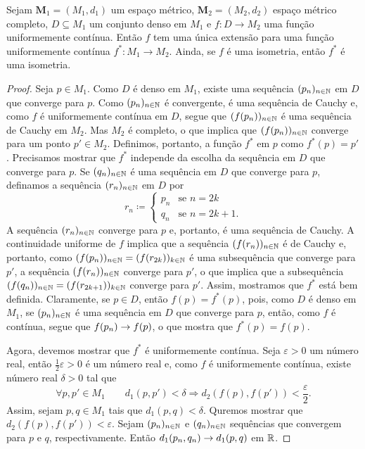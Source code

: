 \begin{teo}
	Sejam $\bm M_1 = (M_1,d_1)$  um espaço métrico, $\bm M_2 = (M_2,d_2)$ espaço métrico completo, $D \subseteq M_1$ um conjunto denso em $M_1$ e $f: D \to M_2$ uma função uniformemente contínua. Então $f$ tem uma única extensão para uma função uniformemente contínua $f^*: M_1 \to M_2$. Ainda, se $f$ é uma isometria, então $f^*$ é uma isometria.
\end{teo}
\begin{proof}
	Seja $p \in M_1$. Como $D$ é denso em $M_1$, existe uma sequência $(p_n)_{n \in \mathbb{N}}$ em $D$ que converge para $p$. Como $(p_n)_{n \in \mathbb{N}}$ é convergente, é uma sequência de Cauchy e, como $f$ é uniformemente contínua em $D$, segue que $(f(p_n))_{n \in \mathbb{N}}$ é uma sequência de Cauchy em $M_2$. Mas $M_2$ é completo, o que implica que $(f(p_n))_{n \in \mathbb{N}}$ converge para um ponto $p' \in M_2$. Definimos, portanto, a função $f^*$ em $p$ como $f^*(p)=p'$. Precisamos mostrar que $f^*$ independe da escolha da sequência em $D$ que converge para $p$. Se $(q_n)_{n \in \mathbb{N}}$ é uma sequência em $D$ que converge para $p$, definamos a sequência $(r_n)_{n \in \mathbb{N}}$ em $D$ por
	\begin{equation*}
	r_n \coloneqq
			\begin{cases}
			p_n &\text{se $n=2k$}\\
			q_n &\text{se $n=2k+1$}.
			\end{cases}
	\end{equation*}
A sequência $(r_n)_{n \in \mathbb{N}}$ converge para $p$ e, portanto, é uma sequência de Cauchy. A continuidade uniforme de $f$ implica que a sequência $(f(r_n))_{n \in \mathbb{N}}$ é de Cauchy e, portanto, como $(f(p_n))_{n \in \mathbb{N}}=(f(r_{2k}))_{k \in \mathbb{N}}$ é uma subsequência que converge para $p'$, a sequência $(f(r_n))_{n \in \mathbb{N}}$ converge para $p'$, o que implica que a subsequência $(f(q_n))_{n \in \mathbb{N}}=(f(r_{2k+1}))_{k \in \mathbb{N}}$ converge para $p'$. Assim, mostramos que $f^*$ está bem definida. Claramente, se $p \in D$, então $f(p)=f^*(p)$, pois, como $D$ é denso em $M_1$, se $(p_n)_{n \in \mathbb{N}}$ é uma sequência em $D$ que converge para $p$, então, como $f$ é contínua, segue que $f(p_n) \rightarrow f(p)$, o que mostra que $f^*(p)=f(p)$.

	Agora, devemos mostrar que $f^*$ é uniformemente contínua. Seja $\varepsilon > 0$ um número real, então $\frac{1}{2}\varepsilon > 0$ é um número real e, como $f$ é uniformemente contínua, existe número real $\delta > 0$ tal que
	\begin{equation*}
	\forall p,p' \in M_1 \qquad d_1(p,p') < \delta \Rightarrow d_2(f(p),f(p')) < \frac{\varepsilon}{2}.
	\end{equation*}
Assim, sejam $p,q \in M_1$ tais que $d_1(p,q) < \delta$. Quremos mostrar que $d_2(f(p),f(p')) < \varepsilon$. Sejam $(p_n)_{n \in \mathbb{N}}$ e $(q_n)_{n \in \mathbb{N}}$ sequências que convergem para $p$ e $q$, respectivamente. Então $d_1(p_n,q_n) \rightarrow d_1(p,q)$ em $\mathbb{R}$.


\end{proof}

